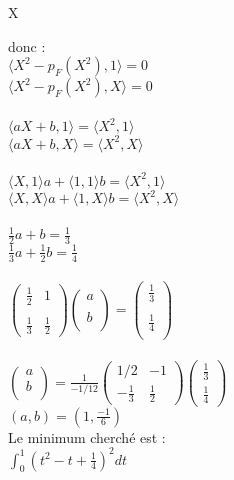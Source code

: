 X\documentclass{article}
\begin{document}
donc : \\
$\langle X^2-p_F(X^2),1 \rangle=0$ \\
$\langle X^2-p_F(X^2),X \rangle=0$ \\ \\
$\langle aX+b,1 \rangle = \langle X^2,1 \rangle $ \\
$\langle aX+b,X \rangle = \langle X^2,X \rangle$  \\ \\
$\langle X,1 \rangle a + \langle 1,1 \rangle b= \langle X^2,1 \rangle$ \\
$\langle X,X \rangle a + \langle 1,X \rangle b= \langle X^2,X \rangle$ \\ \\
$\frac{1}{2} a +b = \frac{1}{3}$ \\
$\frac{1}{3}a +\frac{1}{2}b =\frac{1}{4}$ \\ \\
$\begin{pmatrix}
\frac{1}{2} & 1 \\ \\
\frac{1}{3} & \frac{1}{2}
\end{pmatrix}
\begin{pmatrix}
  a \\ \\
  b \\
  \end{pmatrix}
  =
  \begin{pmatrix}
    \frac{1}{3} \\ \\
    \frac{1}{4} \\
    \end{pmatrix}$ \\ \\
$\begin{pmatrix}
a \\
b \\
\end{pmatrix} =
\frac{1}{-1/12}
\begin{pmatrix}
1/2 & -1 \\
-\frac{1}{3} & \frac{1}{2}
\end{pmatrix}
\begin{pmatrix}
\frac 1 3 \\
\frac 1 4
\end{pmatrix}$ \\
$(a,b)=(1, \frac {-1} 6)$ \\
Le minimum cherché est : \\
$\int_0^1 (t^2-t+\frac{1}{4})^2dt$ \\
\end{document}

